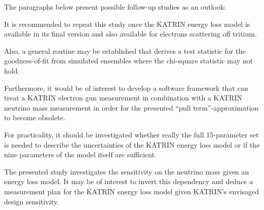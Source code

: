 The paragraphs below present possible follow-up studies as an outlook:

It is recommended to repeat this study once the KATRIN energy loss model is available in its final version and also available for electrons scattering off tritium.

Also, a general routine may be established that derives a test statistic for the goodness-of-fit from simulated ensembles where the chi-square statistic may not hold. 

Furthermore, it would be of interest to develop a software framework that can treat a KATRIN electron gun measurement in combination with a KATRIN neutrino mass measurement in order for the presented ``pull term''-approximation to become obsolete.

For practicality, it should be investigated whether really the full 15-parameter set is needed to describe the uncertainties of the KATRIN energy loss model or if the nine parameters of the model itself are sufficient.

The presented study investigates the sensitivity on the neutrino mass given an energy loss model. It may be of interest to invert this dependency and deduce a measurement plan for the KATRIN energy loss model given KATRIN's envisaged design sensitivity.